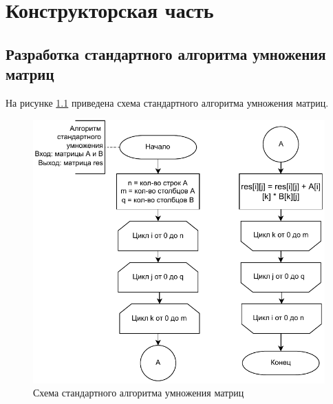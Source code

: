 \chapter{Конструкторская часть}

\section{Разработка стандартного алгоритма умножения матриц}
На рисунке \ref{img:simple} приведена схема стандартного алгоритма умножения матриц.
\begin{figure}[h]
	\centering
	\includegraphics[width=140mm]{images/simple}
	\caption{Схема стандартного алгоритма умножения матриц}
	\label{img:simple}
\end{figure}

